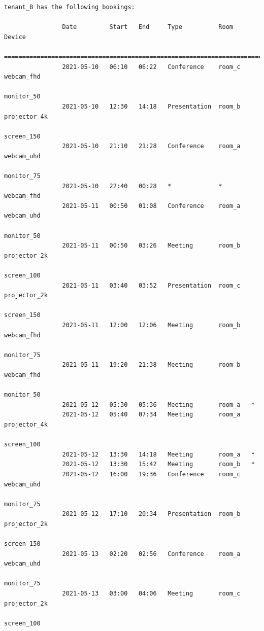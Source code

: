 \documentclass{article}
\begin{document}
\begin{Verbatim}[gobble=8]
                tenant_B has the following bookings:
                
                Date         Start   End     Type          Room     Device
                ===========================================================================
                2021-05-10   06:10   06:22   Conference    room_c   webcam_fhd
                                                                    monitor_50
                2021-05-10   12:30   14:18   Presentation  room_b   projector_4k
                                                                    screen_150
                2021-05-10   21:10   21:28   Conference    room_a   webcam_uhd
                                                                    monitor_75
                2021-05-10   22:40   00:28   *             *        webcam_fhd
                2021-05-11   00:50   01:08   Conference    room_a   webcam_uhd
                                                                    monitor_50
                2021-05-11   00:50   03:26   Meeting       room_b   projector_2k
                                                                    screen_100
                2021-05-11   03:40   03:52   Presentation  room_c   projector_2k
                                                                    screen_150
                2021-05-11   12:00   12:06   Meeting       room_b   webcam_fhd
                                                                    monitor_75
                2021-05-11   19:20   21:38   Meeting       room_b   webcam_fhd
                                                                    monitor_50
                2021-05-12   05:30   05:36   Meeting       room_a   *
                2021-05-12   05:40   07:34   Meeting       room_a   projector_4k
                                                                    screen_100
                2021-05-12   13:30   14:18   Meeting       room_a   *
                2021-05-12   13:30   15:42   Meeting       room_b   *
                2021-05-12   16:00   19:36   Conference    room_c   webcam_uhd
                                                                    monitor_75
                2021-05-12   17:10   20:34   Presentation  room_b   projector_2k
                                                                    screen_150
                2021-05-13   02:20   02:56   Conference    room_a   webcam_uhd
                                                                    monitor_75
                2021-05-13   03:00   04:06   Meeting       room_c   projector_2k
                                                                    screen_100

\end{Verbatim}
\end{document}
